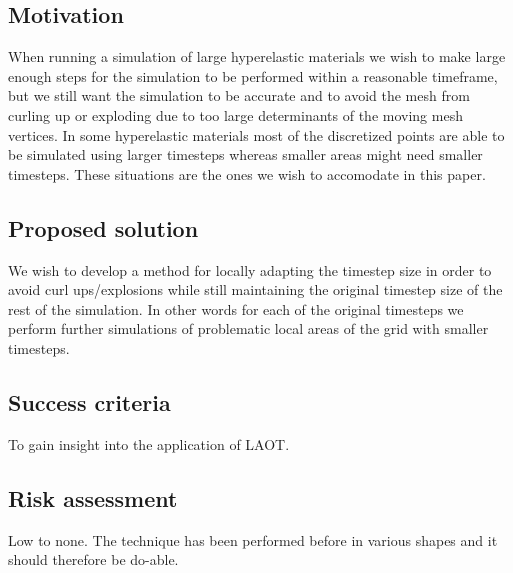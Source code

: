 \documentclass[11pt,a4paper]{article}
\begin{document}
\subsection{Motivation}
When running a simulation of large hyperelastic materials we wish to make
large enough steps for the simulation to be performed within a reasonable
timeframe, but we still want the simulation to be accurate and to avoid
the mesh from curling up or exploding due to too large determinants of the
moving mesh vertices. In some hyperelastic materials most of the
discretized points are able to be simulated using larger timesteps whereas
smaller areas might need smaller timesteps. These situations are the ones
we wish to accomodate in this paper.

\subsection{Proposed solution}
We wish to develop a method for locally adapting the timestep size in
order to avoid curl ups/explosions while still maintaining the original
timestep size of the rest of the simulation. In other words for each of
the original timesteps we perform further simulations of problematic local
areas of the grid with smaller timesteps.

\subsection{Success criteria}
To gain insight into the application of LAOT.

\subsection{Risk assessment}
Low to none. The technique has been performed before in various shapes and it
should therefore be do-able.
\end{document}
